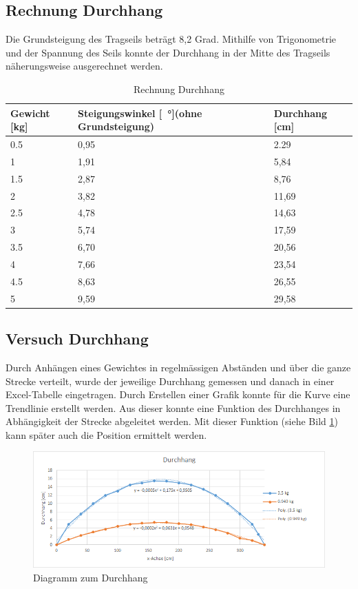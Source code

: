 \documentclass[a4paper]{report}
\begin{document}
\subsection{Rechnung Durchhang}
Die Grundsteigung des Tragseils beträgt 8,2 Grad. Mithilfe von Trigonometrie und der Spannung des Seils konnte der Durchhang in der Mitte des Tragseils näherungsweise ausgerechnet werden.

\vspace{1em}
\noindent
\begin{table}[h!]
	\begin{tabular}{|p{}|p{}|p{}|}
		\hline
		\textbf{Gewicht [kg]} & \textbf{Steigungswinkel [\SI{}{\degree}](ohne Grundsteigung)} &\textbf{Durchhang [cm]}\\
		\hline
		0.5&0,95&2.29\\
		\hline
		1&1,91&5,84\\
		\hline
		1.5&2,87&8,76\\
		\hline
		2&3,82&11,69\\
		\hline
		2.5&4,78&14,63\\
		\hline
		3&5,74&17,59\\
		\hline
		3.5&6,70&20,56\\
		\hline
		4&7,66&23,54\\
		\hline
		4.5&8,63&26,55\\
		\hline
		5&9,59&29,58\\
		\hline
	\end{tabular}

	\caption{Rechnung Durchhang}
	\label{tbl:DurchhangRechnung}
\end{table}

\subsection{Versuch Durchhang}
Durch Anhängen eines Gewichtes in regelmässigen Abständen und über die ganze Strecke verteilt, wurde der jeweilige Durchhang gemessen und danach in einer Excel-Tabelle eingetragen. Durch Erstellen einer Grafik konnte für die Kurve eine Trendlinie erstellt werden. Aus dieser konnte eine Funktion des Durchhanges in Abhängigkeit der Strecke abgeleitet werden. Mit dieser Funktion (siehe Bild \ref{fig:Durchhang_v1}) kann später auch die Position ermittelt werden.
\begin{figure}[h!]
	\centering
	\includegraphics[width=\textwidth,keepaspectratio]{Durchhang_v1}
	\caption{Diagramm zum Durchhang}
	\label{fig:Durchhang_v1}
\end{figure}
\end{document}
